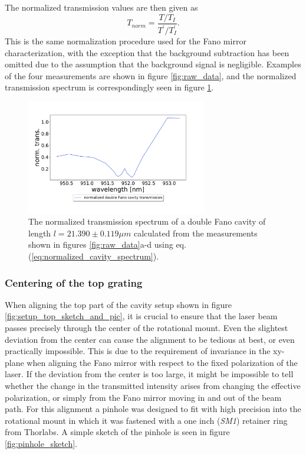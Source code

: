 The normalized transmission values are then given as
\begin{equation}
    T_{norm} = \frac{T/T_I}{T^{\prime}/T_I^{\prime}}.
    \label{eq:normalized_cavity_spectrum}
\end{equation}
This is the same normalization procedure used for the Fano mirror characterization, with the exception that the background subtraction has been omitted due to the assumption that the background signal is negligible. Examples of the four measurements are shown in figure \ref{fig:raw_data}, and the normalized transmission spectrum is correspondingly seen in figure \ref{fig:raw_data_normalized_transmission}.

\begin{figure}[h!]
    \centering
    \includegraphics[width=0.7\textwidth]{figures/raw_data_normalized_transmission.pdf}
    \caption{The normalized transmission spectrum of a double Fano cavity of length $l=21.390 \pm 0.119 \mu m$ calculated from the measurements shown in figures \ref{fig:raw_data}a-d using eq. (\ref{eq:normalized_cavity_spectrum}).}
    \label{fig:raw_data_normalized_transmission}
\end{figure}

\clearpage
\subsubsection{Centering of the top grating}\label{sec:pinhole_method}

When aligning the top part of the cavity setup shown in figure \ref{fig:setup_top_sketch_and_pic}, it is crucial to ensure that the laser beam passes precisely through the center of the rotational mount. Even the slightest deviation from the center can cause the alignment to be tedious at best, or even practically impossible. This is due to the requirement of invariance in the xy-plane when aligning the Fano mirror with respect to the fixed polarization of the laser. If the deviation from the center is too large, it might be impossible to tell whether the change in the transmitted intensity arises from changing the effective polarization, or simply from the Fano mirror moving in and out of the beam path. For this alignment a pinhole was designed to fit with high precision into the rotational mount in which it was fastened with a one inch (\emph{SM1}) retainer ring from Thorlabs. A simple sketch of the pinhole is seen in figure \ref{fig:pinhole_sketch}.

